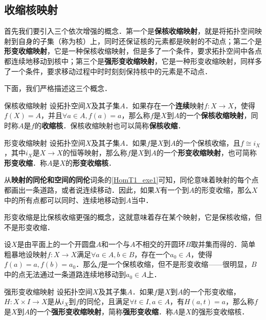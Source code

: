
\subsection{收缩核映射}

首先我们要引入三个依次增强的概念．第一个是\textbf{保核收缩映射}，就是将拓扑空间映射到自身的子集（称为核）上，同时还保证核的元素都是映射的不动点；第二个是\textbf{形变收缩映射}，它是一种保核收缩映射，但是多了一个条件，要求拓扑空间中各点都连续地移动到核中；第三个是\textbf{强形变收缩映射}，它是一种形变收缩映射，同样多了一个条件，要求移动过程中时时刻刻保持核中的元素是不动点．

下面，我们严格描述这三个概念．

\begin{definition}{保核收缩映射}
设拓扑空间$X$及其子集$A$．如果存在一个\textbf{连续}映射$f:X\rightarrow X$，使得$f(X)=A$，并且$\forall a\in A, f(a)=a$，那么称$f$是$X$到$A$的一个\textbf{保核收缩映射}，同时称$A$是$f$的\textbf{收缩核}．保核收缩映射也可以简称\textbf{保核收缩}．
\end{definition}

\begin{definition}{形变收缩映射}
设拓扑空间$X$及其子集$A$．如果$f$是$X$到$A$的一个保核收缩，且$f\cong i_X$，其中$i_X$是$X\rightarrow X$的恒等映射，那么称$f$是$X$到$A$的一个\textbf{形变收缩映射}，也可简称\textbf{形变收缩}．称$A$是$X$的\textbf{形变收缩核}．
\end{definition}

从\textbf{映射的同伦和空间的同伦}词条的\autoref{HomT1_exe1}可知，同伦意味着映射的每个点都画出一条道路，或者说连续移动．因此，如果$X$有一个到$A$的形变收缩，那么$X$中的所有点都可以同时、连续地移动到$A$当中．

形变收缩是比保核收缩更强的概念，这就意味着存在某个映射，它是保核收缩，但不是形变收缩．

\begin{example}{}
设$X$是由平面上的一个开圆盘$A$和一个与$A$不相交的开圆环$B$取并集而得的．简单粗暴地设映射$f:X\rightarrow X$满足$\forall a\in A, b\in B$，存在一个$a_0\in A$，使得$f(a)=a, f(b)=a_0$．那么$f$是一个保核收缩，但不是形变收缩——很明显，$B$中的点无法通过一条道路连续地移动到$a_0\in A$上．
\end{example}

\begin{definition}{强形变收缩映射}
设拓扑空间$X$及其子集$A$．如果$f$是$X$到$A$的一个形变收缩，$H:X\times I\rightarrow X$是从$i_X$到$f$的同伦，且满足$\forall t\in I, a\in A$，有$H(a, t)=a$，那么称$f$是$X$到$A$的一个\textbf{强形变收缩映射}，简称\textbf{强形变收缩}．称$A$是$X$的强形变收缩核．
\end{definition}

